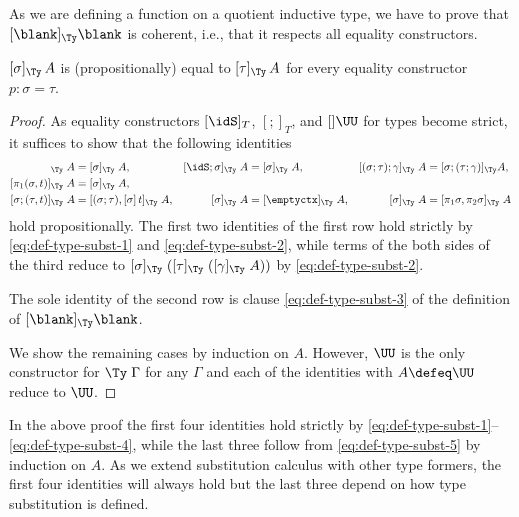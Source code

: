 \documentclass[a4paper,UKenglish,numberwithinsect,cleveref,thm-restate]{lipics-v2021}
\newcommand{\danger}{\marginpar[\hfill\dbend]{\dbend\hfill}}
\newcommand{\LT}[2][]{\todo[inline,author={L-T},caption={},color={pink},#1]{#2}}
\newcommand{\Fredrik}[2][]{\todo[inline,author={Fred},caption={},#1]{#2}}
\begin{document}
As we are defining a function on a quotient inductive type, we have to prove that $[\blank]_{\Ty}\blank$ is coherent, i.e., that it respects all equality constructors.
\begin{proposition}[Coherence]\label{prop:coherence-1}
  $[\sigma]_{\Ty}\,A$ is (propositionally) equal to $[\tau]_{\Ty}\,A$ for every equality constructor $p : \sigma = \tau$.
  \danger
\end{proposition}
\begin{proof}
  As equality constructors $[\idS]_T$, $[;]_T$, and $[]\UU$ for types become strict, it suffices to show that the following identities
  \begin{align*}
    [\sigma;\idS]_{\Ty} \;A          & = [\sigma]_{\Ty}\;A,
                                     & [\idS;\sigma]_{\Ty} \;A          & = [\sigma]_{\Ty}\;A,
                                     & [(\sigma;\tau);\gamma]_{\Ty} \;A & = [\sigma; (\tau; \gamma)]_{\Ty}A, \\
    [\pi_1(\sigma, t)]_{\Ty}\;A      & = [\sigma]_{\Ty}\;A, \\
    [\sigma; (\tau, t)]_{\Ty} \;A    & = [(\sigma;\tau), [\sigma]\, t]_{\Ty}\;A,
                                     & [\sigma]_{\Ty} \;A               & = [\emptyctx]_{\Ty}\;A,
                                     & [\sigma]_{\Ty} \;A               & = [\pi_1\sigma, \pi_2\sigma]_{\Ty}\;A
  \end{align*}
  hold propositionally.
  The first two identities of the first row hold strictly by \eqref{eq:def-type-subst-1} and \eqref{eq:def-type-subst-2}, while terms of the both sides of the third reduce to $[\sigma]_{\Ty}\;([\tau]_{\Ty}\;([\gamma]_{\Ty}\;A))$ by \eqref{eq:def-type-subst-2}.

  The sole identity of the second row is clause \eqref{eq:def-type-subst-3} of the definition of $[\blank]_{\Ty}\blank$.

  We show the remaining cases by induction on $A$.
  However, $\UU$ is the only constructor for $\Ty\;\Gamma$ for any $\Gamma$ and each of the identities with $A \defeq \UU$ reduce to $\UU$.
\end{proof}
\begin{remark}\label{re:coherence-proof}
  In the above proof the first four identities hold strictly by \eqref{eq:def-type-subst-1}--\eqref{eq:def-type-subst-4}, while the last three follow from \eqref{eq:def-type-subst-5} by induction on $A$.
  As we extend substitution calculus with other type formers, the first four identities will always hold but the last three depend on how type substitution is defined.
\end{remark}
\end{document}
